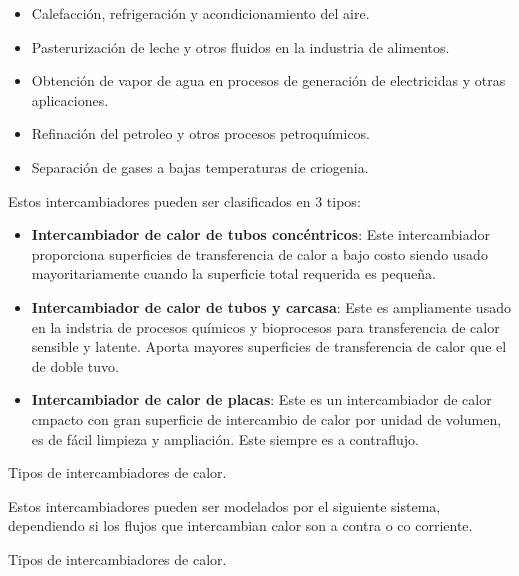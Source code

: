 \begin{itemize}
    \item Calefacción, refrigeración y acondicionamiento del aire.
    \item Pasterurización de leche y otros fluidos en la industria de alimentos.
    \item Obtención de vapor de agua en procesos de generación de electricidas y otras aplicaciones.
    \item Refinación del petroleo y otros procesos petroquímicos.
    \item Separación de gases a bajas temperaturas de criogenia.
\end{itemize}

Estos intercambiadores pueden ser clasificados en 3 tipos:

\begin{itemize}
    \item \textbf{Intercambiador de calor de tubos concéntricos}: Este intercambiador proporciona superficies de transferencia de calor a bajo costo siendo usado mayoritariamente cuando la superficie total requerida es pequeña.
    \item \textbf{Intercambiador de calor de tubos y carcasa}: Este es ampliamente usado en la indstria de procesos químicos y bioprocesos para transferencia de calor sensible y latente. Aporta mayores superficies de transferencia de calor que el de doble tuvo.
    \item \textbf{Intercambiador de calor de placas}: Este es un intercambiador de calor cmpacto con gran superficie de intercambio de calor por unidad de volumen, es de fácil limpieza y ampliación. Este siempre es a contraflujo.
\end{itemize}

\begin{images}[\label{imagenmultiple}]{Tipos de intercambiadores de calor.}
\end{images}

Estos intercambiadores pueden ser modelados por el siguiente sistema, dependiendo si los flujos que intercambian calor son a contra o co corriente.


\begin{images}[\label{imagenmultiple}]{Tipos de intercambiadores de calor.}
\end{images}

